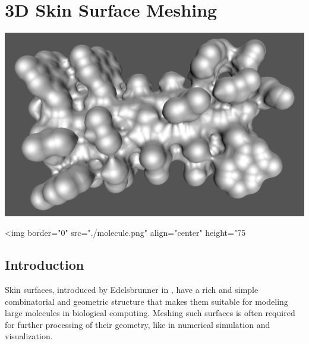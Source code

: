 
\newcommand{\dabs}[1]{{\parallel\! #1 \!\parallel}}

\chapter{3D Skin Surface Meshing}
\label{chapter_SkinSurface}

\minitoc

\begin{ccTexOnly}
\begin{center}
\includegraphics[width=.75\textwidth]{Skin_surface_3/molecule}
\end{center}
\end{ccTexOnly}
\begin{ccHtmlOnly}
<img border="0" src="./molecule.png" align="center" height="75%
\end{ccHtmlOnly}

\section{Introduction}
\label{sectionSkinSurfaceIntro}

Skin surfaces, introduced by Edelsbrunner in \cite{cgal:e-dssd-99},
have a rich and simple combinatorial and geometric structure that
makes them suitable for modeling large molecules in biological
computing.  Meshing such surfaces is often required for further
processing of their geometry, like in numerical simulation and
visualization.

